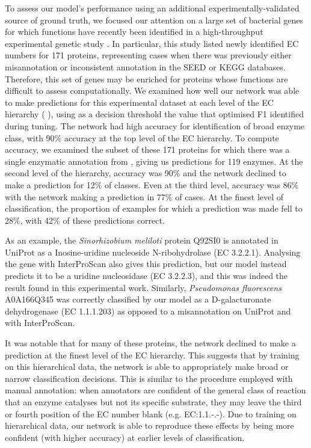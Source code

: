 To assess our model's performance using an additional experimentally-validated source of ground truth, we focused our attention on a large set of bacterial genes for which functions have recently been identified in a high-throughput experimental genetic study \citep{phenotypes}. In particular, this study listed newly identified EC numbers for 171 proteins, representing cases when there was previously either misannotation or inconsistent annotation in the SEED or KEGG databases. Therefore, this set of genes may be enriched for proteins whose functions are difficult to assess computationally.
We examined how well our network was able to make predictions for this experimental dataset at each level of the EC hierarchy (%
), using as a decision threshold the value that optimised F1 identified during tuning. The network had high accuracy for identification of broad enzyme class, with 90\% accuracy at the top level of the EC hierarchy. To compute accuracy, we examined the subset of these 171 proteins for which there was a single enzymatic annotation from \cite{phenotypes}, giving us predictions for 119 enzymes. At the second level of the hierarchy, accuracy was 90\% and the network declined to make a prediction for 12\% of classes. Even at the third level, accuracy was 86\% with the network making a prediction in 77\% of cases. At the finest level of classification, the proportion of examples for which a prediction was made fell to 28\%, with 42\% of these predictions correct.

As an  example, the \textit{Sinorhizobium meliloti} protein Q92SI0 is annotated in UniProt as a Inosine-uridine nucleoside N-ribohydrolase (EC 3.2.2.1).  Analysing the gene with InterProScan \citep{interproscan} also gives this prediction, but our model instead predicts it to be a uridine nucleosidase (EC 3.2.2.3), and this was indeed the result found in this experimental work. Similarly, \textit{Pseudomonas fluorescens} A0A166Q345 was correctly classified by our model as a D-galacturonate dehydrogenase (EC 1.1.1.203) as opposed to a misannotation on UniProt and with InterProScan.


It was notable that for many of these proteins, the network declined to make a prediction at the finest level of the EC hierarchy. This suggests that by training on this hierarchical data, the network is able to appropriately make broad or narrow classification decisions. This is similar to the procedure employed with manual annotation: when annotators are confident of the general class of reaction that an enzyme catalyses but not its specific substrate, they may leave the third or fourth position of the EC number blank (e.g. EC:1.1.-.-). Due to training on hierarchical data, our network is able to reproduce these effects by being more confident (with higher accuracy) at earlier levels of classification.

